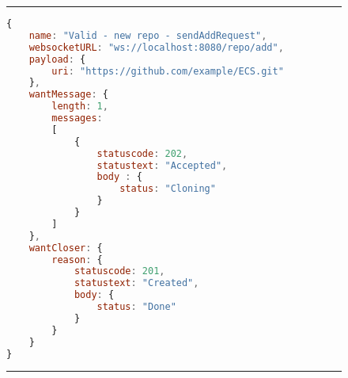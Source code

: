 \begin{figure}[H]
\noindent\rule{\textwidth}{1pt}
\begin{lstlisting}[language=JavaScript, caption= {JSON structure for a valid test case}, label={lst:testCase}]
{
	name: "Valid - new repo - sendAddRequest",
	websocketURL: "ws://localhost:8080/repo/add",
	payload: {
		uri: "https://github.com/example/ECS.git"
	},
	wantMessage: {
		length: 1,
		messages:
		[
			{
				statuscode: 202,
				statustext: "Accepted",
				body : {
					status: "Cloning"
				}
			}
		]
	},
	wantCloser: {
		reason: {
			statuscode: 201,
			statustext: "Created",
			body: {
				status: "Done"
			}
		}
	}
}
\end{lstlisting}
\noindent\rule{\textwidth}{1pt}
\end{figure}
